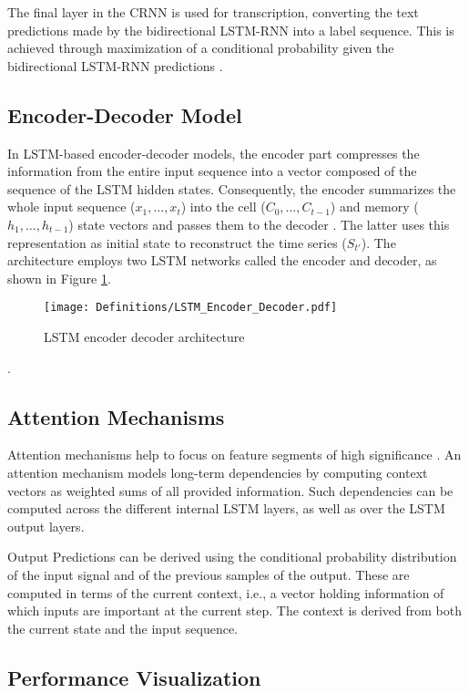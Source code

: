 \documentclass[journal,article,accept,moreauthors,pdftex]{Definitions/mdpi}
\begin{document}
The final layer in the CRNN is used for transcription, 
converting the text predictions made by the  bidirectional
LSTM-RNN into a label sequence. This is achieved through maximization of  a
conditional probability given the bidirectional LSTM-RNN
predictions  \cite{ref81}.

\subsection{Encoder-Decoder Model}

In LSTM-based encoder-decoder models, the encoder part compresses the information
from the entire input sequence into a vector composed of the sequence
of the LSTM hidden states. Consequently, the encoder summarizes the
whole input sequence ($x_1, \ldots, x_t$) into the cell ($C_0, \ldots, C_{t-1}$) and memory ($h_1, \ldots, h_{t-1}$) state vectors and passes them to the decoder \cite{ref16}. The latter uses this representation as initial state to reconstruct the time series ($S_{t'}$).
 The architecture employs two LSTM networks called the encoder and decoder, as shown in  Figure \ref{fig:LSTM_Decoder_Encoder}.

\begin{figure}[tph!]
\texttt{[image: Definitions/LSTM\_Encoder\_Decoder.pdf]}
\centering
\caption{LSTM encoder decoder architecture}
\label{fig:LSTM_Decoder_Encoder}
\end{figure}.

\subsection{Attention Mechanisms}

Attention mechanisms help to focus on feature segments of high
significance \cite{ref100}. An attention mechanism \cite{ref101} models long-term dependencies by computing context
vectors as weighted sums of all provided information. Such dependencies can be computed across the different internal LSTM layers, as well as over
the LSTM output layers. 


 Output Predictions  can  be  derived  using  the  conditional probability distribution of the input signal and of the previous samples of the output. These are computed in terms of  the current context, i.e., a vector holding information of which inputs are important at the current step. The context is derived from both the current state and the input sequence. 
 
\subsection{Performance Visualization}
\end{document}
